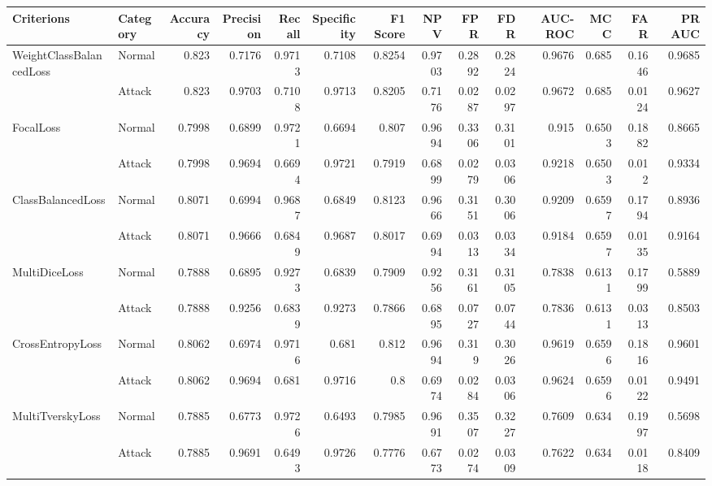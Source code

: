 \begin{tabular}{llrrrrrrrrrrrr}
\hline
 Criterions              & Category   &   Accuracy &   Precision &   Recall &   Specificity &   F1 Score &    NPV &    FPR &    FDR &   AUC-ROC &    MCC &    FAR &   PR AUC \\
\hline
 WeightClassBalancedLoss & Normal     &     0.823  &      0.7176 &   0.9713 &        0.7108 &     0.8254 & 0.9703 & 0.2892 & 0.2824 &    0.9676 & 0.685  & 0.1646 &   0.9685 \\
                         & Attack     &     0.823  &      0.9703 &   0.7108 &        0.9713 &     0.8205 & 0.7176 & 0.0287 & 0.0297 &    0.9672 & 0.685  & 0.0124 &   0.9627 \\
 FocalLoss               & Normal     &     0.7998 &      0.6899 &   0.9721 &        0.6694 &     0.807  & 0.9694 & 0.3306 & 0.3101 &    0.915  & 0.6503 & 0.1882 &   0.8665 \\
                         & Attack     &     0.7998 &      0.9694 &   0.6694 &        0.9721 &     0.7919 & 0.6899 & 0.0279 & 0.0306 &    0.9218 & 0.6503 & 0.012  &   0.9334 \\
 ClassBalancedLoss       & Normal     &     0.8071 &      0.6994 &   0.9687 &        0.6849 &     0.8123 & 0.9666 & 0.3151 & 0.3006 &    0.9209 & 0.6597 & 0.1794 &   0.8936 \\
                         & Attack     &     0.8071 &      0.9666 &   0.6849 &        0.9687 &     0.8017 & 0.6994 & 0.0313 & 0.0334 &    0.9184 & 0.6597 & 0.0135 &   0.9164 \\
 MultiDiceLoss           & Normal     &     0.7888 &      0.6895 &   0.9273 &        0.6839 &     0.7909 & 0.9256 & 0.3161 & 0.3105 &    0.7838 & 0.6131 & 0.1799 &   0.5889 \\
                         & Attack     &     0.7888 &      0.9256 &   0.6839 &        0.9273 &     0.7866 & 0.6895 & 0.0727 & 0.0744 &    0.7836 & 0.6131 & 0.0313 &   0.8503 \\
 CrossEntropyLoss        & Normal     &     0.8062 &      0.6974 &   0.9716 &        0.681  &     0.812  & 0.9694 & 0.319  & 0.3026 &    0.9619 & 0.6596 & 0.1816 &   0.9601 \\
                         & Attack     &     0.8062 &      0.9694 &   0.681  &        0.9716 &     0.8    & 0.6974 & 0.0284 & 0.0306 &    0.9624 & 0.6596 & 0.0122 &   0.9491 \\
 MultiTverskyLoss        & Normal     &     0.7885 &      0.6773 &   0.9726 &        0.6493 &     0.7985 & 0.9691 & 0.3507 & 0.3227 &    0.7609 & 0.634  & 0.1997 &   0.5698 \\
                         & Attack     &     0.7885 &      0.9691 &   0.6493 &        0.9726 &     0.7776 & 0.6773 & 0.0274 & 0.0309 &    0.7622 & 0.634  & 0.0118 &   0.8409 \\
\hline
\end{tabular}